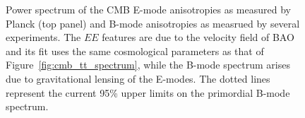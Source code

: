 \begin{figure}[!t]
    \caption{Power spectrum of the CMB E-mode anisotropies as measured by Planck (top panel) and B-mode anisotropies as measrued by several experiments. The $EE$ features are due to the velocity field of BAO and its fit uses the same cosmological parameters as that of Figure~\ref{fig:cmb_tt_spectrum}, while the B-mode spectrum arises due to gravitational lensing of the E-modes. The dotted lines represent the current 95\% upper limits on the primordial B-mode spectrum.}
    \label{fig:cmb_ee_bb_spectrum}
\end{figure}

